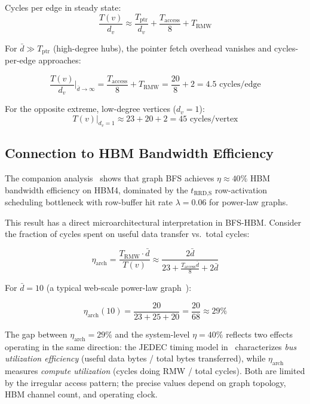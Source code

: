 Cycles per edge in steady state:
\begin{equation}
\frac{T(v)}{d_v} \approx
\frac{T_\text{ptr}}{d_v}
+ \frac{T_\text{access}}{8}
+ T_\text{RMW}
\label{eq:cpe}
\end{equation}

For $\bar{d} \gg T_\text{ptr}$ (high-degree hubs), the pointer fetch overhead
vanishes and cycles-per-edge approaches:

\begin{equation}
\frac{T(v)}{d_v} \bigg|_{\bar{d} \to \infty}
= \frac{T_\text{access}}{8} + T_\text{RMW}
= \frac{20}{8} + 2 = 4.5 \text{ cycles/edge}
\label{eq:cpe_limit}
\end{equation}

For the opposite extreme, low-degree vertices ($d_v = 1$):
\begin{equation}
T(v)\big|_{d_v=1} \approx 23 + 20 + 2 = 45 \text{ cycles/vertex}
\label{eq:low_degree}
\end{equation}

\subsection{Connection to HBM Bandwidth Efficiency}

The companion analysis~\cite{fritz2026rmwwall} shows that graph BFS achieves
$\eta \approx 40\%$ HBM bandwidth efficiency on HBM4, dominated by the
$t_\text{RRD,S}$ row-activation scheduling bottleneck with row-buffer hit rate
$\lambda = 0.06$ for power-law graphs.

This result has a direct microarchitectural interpretation in BFS-HBM.
Consider the fraction of cycles spent on useful data transfer vs.\ total cycles:

\begin{equation}
\eta_\text{arch} = \frac{T_\text{RMW} \cdot \bar{d}}{T(v)}
\approx \frac{2\bar{d}}{23 + \frac{T_\text{access}\bar{d}}{8} + 2\bar{d}}
\label{eq:eta_arch}
\end{equation}

For $\bar{d} = 10$ (a typical web-scale power-law graph~\cite{leskovec2009community}):

\begin{equation}
\eta_\text{arch}(10) = \frac{20}{23 + 25 + 20} = \frac{20}{68} \approx 29\%
\end{equation}

The gap between $\eta_\text{arch} = 29\%$ and the system-level $\eta = 40\%$ reflects
two effects operating in the same direction: the JEDEC timing model in~\cite{fritz2026rmwwall}
characterizes \emph{bus utilization efficiency} (useful data bytes / total bytes transferred),
while $\eta_\text{arch}$ measures \emph{compute utilization} (cycles doing RMW /
total cycles). Both are limited by the irregular access pattern; the precise values
depend on graph topology, HBM channel count, and operating clock.

